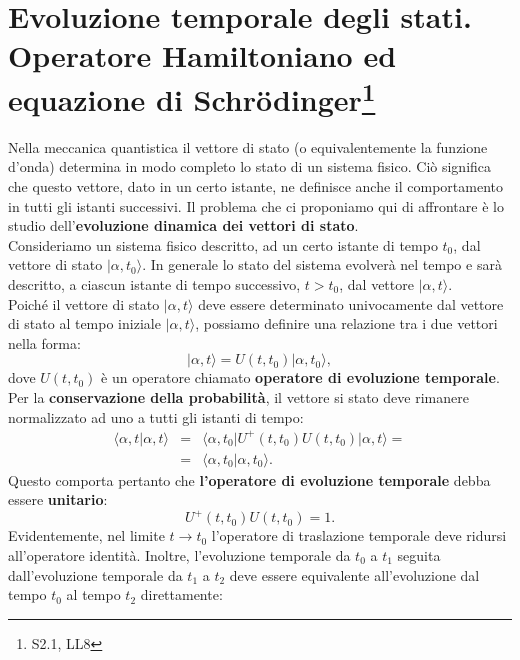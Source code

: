 \documentclass[a4paper,12pt,oneside]{book}
\begin{document}
\section[Evoluzione temporale degli stati]{Evoluzione temporale degli stati.\\Operatore Hamiltoniano ed equazione di Schr\"{o}dinger\footnote{S2.1, LL8} }
Nella meccanica quantistica il vettore di stato (o equivalentemente la funzione d'onda) determina in modo completo lo stato di un sistema fisico. Ciò significa che questo vettore, dato in un certo istante, ne definisce anche il comportamento in tutti gli istanti successivi. Il problema che ci proponiamo qui di affrontare è lo studio dell'\textbf{evoluzione dinamica dei vettori di stato}.\\
Consideriamo un sistema fisico descritto, ad un certo istante di tempo $t_0$, dal vettore di stato $\vert \alpha, t_0 \rangle$. In generale lo stato del sistema evolverà nel tempo e sarà descritto, a ciascun istante di tempo successivo, $t>t_0$, dal vettore $\vert \alpha, t\rangle$.\\
Poiché il vettore di stato $\vert \alpha, t \rangle$ deve essere determinato univocamente dal vettore di stato al tempo iniziale $\vert \alpha, t \rangle$, possiamo definire una relazione tra i due vettori nella forma: \begin{equation}
\vert \alpha, t \rangle = U(t,t_0)\vert \alpha, t_0 \rangle,
\end{equation}
dove $U(t,t_0)$ è un operatore chiamato \textbf{operatore di evoluzione temporale}.\\
Per la \textbf{conservazione della probabilità}, il vettore si stato deve rimanere normalizzato ad uno a tutti gli istanti di tempo:
\begin{eqnarray}
\langle \alpha, t \vert \alpha, t \rangle & = &
\langle \alpha, t_0 \vert U^+ (t,t_0) U(t,t_0)\vert \alpha, t \rangle = \nonumber\\
& = & \langle \alpha, t_0 \vert \alpha, t_0 \rangle.
\end{eqnarray}
Questo comporta pertanto che  \textbf{l'operatore di evoluzione temporale} debba essere \textbf{unitario}:
\begin{equation}
U^+ (t,t_0) U(t,t_0)=1.
\end{equation}
Evidentemente, nel limite $t\longrightarrow t_0$ l'operatore di traslazione temporale deve ridursi all'operatore identità. Inoltre, l'evoluzione temporale da $t_0$ a $t_1$ seguita dall'evoluzione temporale da $t_1$ a $t_2$ deve essere equivalente all'evoluzione dal tempo $t_0$ al tempo $t_2$ direttamente:
\end{document}

